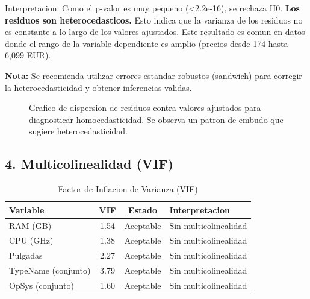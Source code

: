 \documentclass[12pt,a4paper]{article}
\begin{document}
Interpretacion: Como el p-valor es muy pequeno (\textless{}2.2e-16), se rechaza H0. \textbf{Los residuos son heterocedasticos.} Esto indica que la varianza de los residuos no es constante a lo largo de los valores ajustados. Este resultado es comun en datos donde el rango de la variable dependiente es amplio (precios desde 174 hasta 6,099 EUR).

\textbf{Nota:} Se recomienda utilizar errores estandar robustos (sandwich) para corregir la heterocedasticidad y obtener inferencias validas.

\begin{figure}[H]
    \centering
    \caption{Grafico de dispersion de residuos contra valores ajustados para diagnosticar homocedasticidad. Se observa un patron de embudo que sugiere heterocedasticidad.}
    \label{fig:residuos}
\end{figure}

\subsection{4. Multicolinealidad (VIF)}

\begin{table}[H]
\centering
\caption{Factor de Inflacion de Varianza (VIF)}
\begin{tabular}{lccl}
\toprule
\textbf{Variable} & \textbf{VIF} & \textbf{Estado} & \textbf{Interpretacion} \\
\midrule
RAM (GB) & 1.54 & Aceptable & Sin multicolinealidad \\
CPU (GHz) & 1.38 & Aceptable & Sin multicolinealidad \\
Pulgadas & 2.27 & Aceptable & Sin multicolinealidad \\
TypeName (conjunto) & 3.79 & Aceptable & Sin multicolinealidad \\
OpSys (conjunto) & 1.60 & Aceptable & Sin multicolinealidad \\
\bottomrule
\end{tabular}
\end{table}
\end{document}
